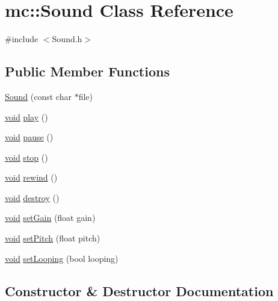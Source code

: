 \hypertarget{classmc_1_1_sound}{}\section{mc\+:\+:Sound Class Reference}
\label{classmc_1_1_sound}


{\ttfamily \#include $<$Sound.\+h$>$}

\subsection*{Public Member Functions}
\begin{DoxyCompactItemize}
\item 
\hyperlink{classmc_1_1_sound_aaa21de95445df04e711c104e7a281b20}{Sound} (const char $\ast$file)
\item 
\hyperlink{_s_d_l__opengles2__gl2ext_8h_ae5d8fa23ad07c48bb609509eae494c95}{void} \hyperlink{classmc_1_1_sound_ada8c6c5ca032301f7d38aa7c996c0f9e}{play} ()
\item 
\hyperlink{_s_d_l__opengles2__gl2ext_8h_ae5d8fa23ad07c48bb609509eae494c95}{void} \hyperlink{classmc_1_1_sound_a67dcafee2327b68452b091e13101fe92}{pause} ()
\item 
\hyperlink{_s_d_l__opengles2__gl2ext_8h_ae5d8fa23ad07c48bb609509eae494c95}{void} \hyperlink{classmc_1_1_sound_a51548f5c106e154185347660e171133b}{stop} ()
\item 
\hyperlink{_s_d_l__opengles2__gl2ext_8h_ae5d8fa23ad07c48bb609509eae494c95}{void} \hyperlink{classmc_1_1_sound_a6b18000746b1f6b5c5efedd58e864ab7}{rewind} ()
\item 
\hyperlink{_s_d_l__opengles2__gl2ext_8h_ae5d8fa23ad07c48bb609509eae494c95}{void} \hyperlink{classmc_1_1_sound_a595bb512e1176165389897728366769c}{destroy} ()
\item 
\hyperlink{_s_d_l__opengles2__gl2ext_8h_ae5d8fa23ad07c48bb609509eae494c95}{void} \hyperlink{classmc_1_1_sound_a2d22dfb3e3a0bc75c25ca0b9d9f19663}{set\+Gain} (float gain)
\item 
\hyperlink{_s_d_l__opengles2__gl2ext_8h_ae5d8fa23ad07c48bb609509eae494c95}{void} \hyperlink{classmc_1_1_sound_ae38a4567c49eeb9f32239659874233c7}{set\+Pitch} (float pitch)
\item 
\hyperlink{_s_d_l__opengles2__gl2ext_8h_ae5d8fa23ad07c48bb609509eae494c95}{void} \hyperlink{classmc_1_1_sound_af80534638f7aed8284514fed8352eec6}{set\+Looping} (bool looping)
\end{DoxyCompactItemize}


\subsection{Constructor \& Destructor Documentation}
